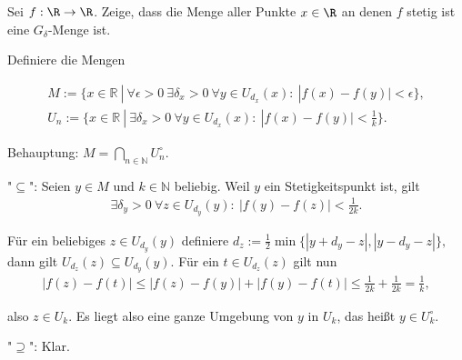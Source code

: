\begin{exercise}
Sei $f: \R \rightarrow \R$. Zeige, dass die Menge aller Punkte $x \in \R$ an
denen $f$ stetig ist eine $G_{\delta}$-Menge ist.
\end{exercise}
\begin{solution}
  Definiere die Mengen

  \begin{align}
  M := \{x \in \mathbb{R} ~|~ \forall \epsilon > 0 ~\exists \delta_x > 0 ~\forall y \in U_{d_x}(x): ~|f(x)-f(y)| < \epsilon\}, \\
  U_n := \{x \in \mathbb{R} ~|~ \exists \delta_x > 0 ~\forall y \in U_{d_x}(x): ~|f(x)-f(y)| < \frac{1}{k}\}.
  \end{align}

  Behauptung: $M = \bigcap_{n \in \mathbb{N}} U_n^\circ.$

  "$\subseteq$": Seien $y \in M$ und $k \in \mathbb{N}$ beliebig. Weil $y$ ein Stetigkeitspunkt ist, gilt
  \begin{align}
      \exists \delta_y > 0 ~\forall z \in U_{d_y}(y): ~|f(y)-f(z)| < \frac{1}{2k}.
  \end{align}

  Für ein beliebiges $z \in U_{d_y}(y)$ definiere $d_z := \frac{1}{2} \min\{|y + d_y - z|, |y - d_y - z|\},$ dann gilt $U_{d_z}(z) \subseteq U_{d_y}(y).$ Für ein $t \in U_{d_z}(z)$ gilt nun
  \begin{align}
      |f(z)-f(t)| \leq |f(z)-f(y)| + |f(y)-f(t)| \leq \frac{1}{2k} + \frac{1}{2k} = \frac{1}{k},
  \end{align}

  also $z \in U_k$. Es liegt also eine ganze Umgebung von $y$ in $U_k$, das heißt $y \in U_k^\circ.$


  "$\supseteq$": Klar.
\end{solution}
